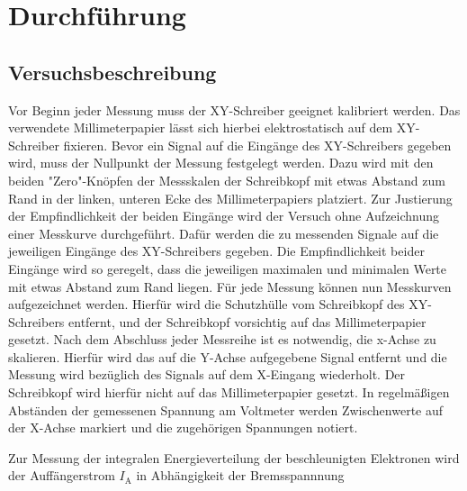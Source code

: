 \section{Durchführung}
\label{sec:Durchführung}



\subsection{Versuchsbeschreibung}
\label{sec:Versuchsbeschreibung}
Vor Beginn jeder Messung muss der XY-Schreiber geeignet kalibriert werden.
Das verwendete Millimeterpapier lässt sich hierbei elektrostatisch auf dem XY-Schreiber fixieren.
Bevor ein Signal auf die Eingänge des XY-Schreibers gegeben wird, muss der Nullpunkt der Messung festgelegt werden. Dazu wird mit den beiden "Zero"-Knöpfen der Messskalen der Schreibkopf mit etwas Abstand zum Rand in der linken, unteren Ecke des Millimeterpapiers platziert.
Zur Justierung der Empfindlichkeit der beiden Eingänge wird der Versuch ohne Aufzeichnung einer Messkurve durchgeführt. Dafür werden die zu messenden Signale auf die jeweiligen Eingänge des XY-Schreibers gegeben.
Die Empfindlichkeit beider Eingänge wird so geregelt, dass die jeweiligen maximalen und minimalen Werte mit etwas Abstand zum Rand liegen.
Für jede Messung können nun Messkurven aufgezeichnet werden. Hierfür wird die Schutzhülle vom Schreibkopf des XY-Schreibers entfernt, und der Schreibkopf vorsichtig auf das Millimeterpapier gesetzt.
Nach dem Abschluss jeder Messreihe ist es notwendig, die x-Achse zu skalieren. Hierfür wird das auf die Y-Achse aufgegebene Signal entfernt und die Messung wird bezüglich des Signals auf dem X-Eingang wiederholt. Der Schreibkopf wird hierfür nicht auf das Millimeterpapier gesetzt.
In regelmäßigen Abständen der gemessenen Spannung am Voltmeter werden Zwischenwerte auf der X-Achse markiert und die zugehörigen Spannungen notiert.

Zur Messung der integralen Energieverteilung der beschleunigten Elektronen wird der Auffängerstrom $I_\mathrm{A}$ in Abhängigkeit der Bremsspannnung 
